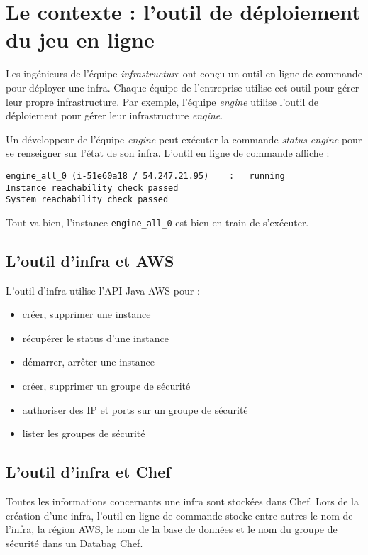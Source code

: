 
\chapter{Le contexte : l'outil de déploiement du jeu en ligne}

Les ingénieurs de l'équipe \textit{infrastructure} ont conçu un outil en ligne
de commande pour déployer une infra.
Chaque équipe de l'entreprise utilise cet outil pour gérer leur propre
infrastructure. Par exemple, l'équipe \textit{engine} utilise l'outil de
déploiement pour gérer leur infrastructure \textit{engine}.

Un développeur de l'équipe \textit{engine} peut exécuter la commande
\textit{status engine} pour se renseigner sur l'état de son infra. L'outil en
ligne de commande affiche :
\begin{verbatim}
engine_all_0 (i-51e60a18 / 54.247.21.95)	:	running
Instance reachability check passed 
System reachability check passed
\end{verbatim}
Tout va bien, l'instance \verb?engine_all_0? est bien en train de s'exécuter.

\section{L'outil d'infra et AWS}

L'outil d'infra utilise l'API Java AWS pour :
\begin{itemize}
  \item créer, supprimer une instance
  \item récupérer le status d'une instance
  \item démarrer, arrêter une instance
  \item créer, supprimer un groupe de sécurité
  \item authoriser des IP et ports sur un groupe de sécurité
  \item lister les groupes de sécurité
\end{itemize}

\section{L'outil d'infra et Chef}

Toutes les informations concernants une infra sont stockées dans Chef.
Lors de la création d'une infra, l'outil en ligne de commande stocke entre
autres le nom de l'infra, la région AWS, le nom de la base de données et le nom
du groupe de sécurité dans un Databag Chef.

